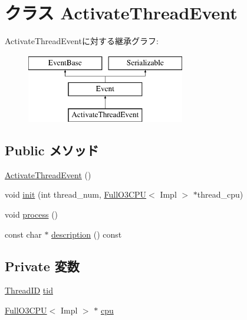 \hypertarget{classFullO3CPU_1_1ActivateThreadEvent}{
\section{クラス ActivateThreadEvent}
\label{classFullO3CPU_1_1ActivateThreadEvent}
}
ActivateThreadEventに対する継承グラフ:\begin{figure}[H]
\begin{center}
\leavevmode
\includegraphics[height=3cm]{classFullO3CPU_1_1ActivateThreadEvent}
\end{center}
\end{figure}
\subsection*{Public メソッド}
\begin{DoxyCompactItemize}
\item 
\hyperlink{classFullO3CPU_1_1ActivateThreadEvent_a9ce281f466d06de2e43efe49b6918c14}{ActivateThreadEvent} ()
\item 
void \hyperlink{classFullO3CPU_1_1ActivateThreadEvent_a0938c51f296f212d5f6f05d174558612}{init} (int thread\_\-num, \hyperlink{classFullO3CPU}{FullO3CPU}$<$ Impl $>$ $\ast$thread\_\-cpu)
\item 
void \hyperlink{classFullO3CPU_1_1ActivateThreadEvent_a2e9c5136d19b1a95fc427e0852deab5c}{process} ()
\item 
const char $\ast$ \hyperlink{classFullO3CPU_1_1ActivateThreadEvent_a5a14fe478e2393ff51f02e9b7be27e00}{description} () const 
\end{DoxyCompactItemize}
\subsection*{Private 変数}
\begin{DoxyCompactItemize}
\item 
\hyperlink{base_2types_8hh_ab39b1a4f9dad884694c7a74ed69e6a6b}{ThreadID} \hyperlink{classFullO3CPU_1_1ActivateThreadEvent_aa508770268ee4ceaf16054b9e0be0e17}{tid}
\item 
\hyperlink{classFullO3CPU}{FullO3CPU}$<$ Impl $>$ $\ast$ \hyperlink{classFullO3CPU_1_1ActivateThreadEvent_a3a3767255bcefd2ce55f94976ab8eb99}{cpu}
\end{DoxyCompactItemize}
